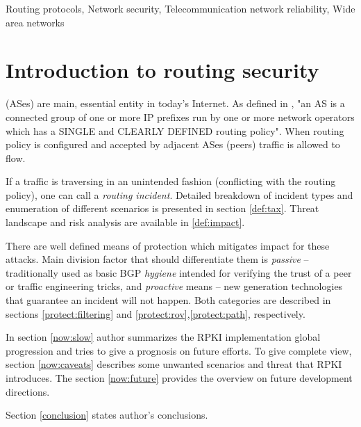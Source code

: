 \documentclass[journal,a4paper,twoside]{IEEEtran}
\begin{document}
\begin{IEEEkeywords}
Routing protocols, Network security, Telecommunication network reliability, Wide area networks
\end{IEEEkeywords}

\IEEEpeerreviewmaketitle


\section{Introduction to routing security}

 (ASes) are main, essential entity in today's Internet. As defined in \cite{rfc1930},
"an AS is a connected group of one or more IP prefixes run by one or more network operators which has a SINGLE and CLEARLY DEFINED routing policy".
When routing policy is configured and accepted by adjacent ASes (peers) traffic is allowed to flow.

If a traffic is traversing in an unintended fashion (conflicting with the routing policy), one can call a \emph{routing incident}.
Detailed breakdown of incident types and enumeration of different scenarios is presented in section \ref{def:tax}.
Threat landscape and risk analysis are available in \ref{def:impact}.

There are well defined means of protection which mitigates impact for these attacks. Main division factor that should differentiate them is \emph{passive} -- traditionally used as basic BGP \emph{hygiene} intended for verifying the trust of a peer or traffic engineering tricks, and \emph{proactive} means -- new generation technologies that guarantee an incident will not happen. Both categories are described in sections \ref{protect:filtering} and \ref{protect:rov},\ref{protect:path}, respectively.

In section \ref{now:slow} author summarizes the RPKI implementation global progression and tries to give a prognosis on future efforts. To give complete view, section \ref{now:caveats} describes some unwanted scenarios and threat that RPKI introduces. The section \ref{now:future} provides the overview on future development directions.

Section \ref{conclusion} states author's conclusions.






\end{document}
